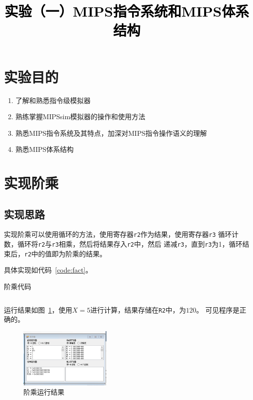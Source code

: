 \documentclass[a4paper,twoside]{article}
\newcommand{\PaperTitle}{实验（一）MIPS指令系统和MIPS体系结构}  %
\begin{document}
\newpage

\title{
	\Large{\textcolor{black}{\PaperTitle}}
}
	
	
\maketitle
	
\tableofcontents
 
\newpage
\setcounter{page}{1}

\begin{spacing}{1.2}

\section{实验目的}

\begin{enumerate}
	\item 了解和熟悉指令级模拟器
	\item 熟练掌握MIPSsim模拟器的操作和使用方法
	\item 熟悉MIPS指令系统及其特点，加深对MIPS指令操作语义的理解
	\item 熟悉MIPS体系结构
\end{enumerate}

\section{实现阶乘}

\subsection{实现思路}

实现阶乘可以使用循环的方法，使用寄存器\texttt{r2}作为结果，使用寄存器\texttt{r3}
循环计数，循环将\texttt{r2}与\texttt{r3}相乘，然后将结果存入\texttt{r2}中，然后
递减\texttt{r3}，直到\texttt{r3}为1，循环结束后，\texttt{r2}中的值即为阶乘的结果。

具体实现如代码~\ref{code:fact}。
\begin{listing}[htb]
	\caption{阶乘代码}
	\label{code:fact}
	\inputminted{nasm}{code/fact.txt}
\end{listing}

运行结果如图~\ref{fig:fact}，使用$X=5$进行计算，结果存储在\texttt{R2}中，为$120$。
可见程序是正确的。
\begin{figure}[htb]
	\centering
	\includegraphics[width=0.4\textwidth]{images/fact.png}
	\caption{阶乘运行结果}
	\label{fig:fact}
\end{figure}


\end{spacing}
\end{document}
